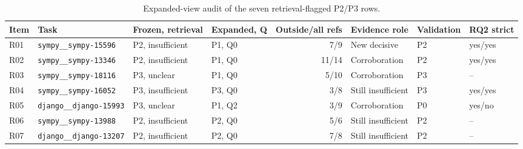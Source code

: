 \begin{table}[htbp]
\centering\scriptsize
\caption{Expanded-view audit of the seven retrieval-flagged P2/P3 rows.}
\label{tab:rrfexpanded}
\setlength{\tabcolsep}{3pt}
\begin{tabular}{llllrlll}
\toprule
Item & Task & Frozen, retrieval & Expanded, Q & Outside/all refs & Evidence role & Validation & RQ2 strict \\
\midrule
R01 & \texttt{sympy\_\_sympy-15596} & P2, insufficient & P1, Q0 & 7/9 & New decisive & P2 & yes/yes \\
R02 & \texttt{sympy\_\_sympy-13346} & P2, insufficient & P1, Q0 & 11/14 & Corroboration & P2 & yes/yes \\
R03 & \texttt{sympy\_\_sympy-18116} & P3, unclear & P1, Q0 & 5/10 & Corroboration & P3 & -- \\
R04 & \texttt{sympy\_\_sympy-16052} & P3, insufficient & P3, Q0 & 3/8 & Still insufficient & P3 & yes/yes \\
R05 & \texttt{django\_\_django-15993} & P3, unclear & P1, Q2 & 3/9 & Corroboration & P0 & yes/no \\
R06 & \texttt{sympy\_\_sympy-13988} & P2, insufficient & P2, Q0 & 5/6 & Still insufficient & P2 & -- \\
R07 & \texttt{django\_\_django-13207} & P2, insufficient & P2, Q0 & 7/8 & Still insufficient & P2 & -- \\
\bottomrule
\end{tabular}
\end{table}
